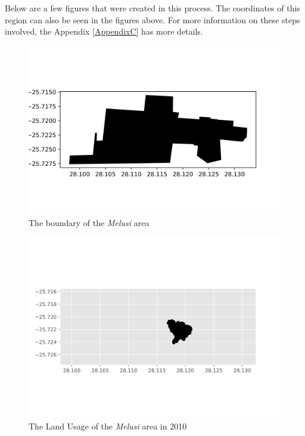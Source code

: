 Below are a few figures that were created in this process. The coordinates of this region can also be seen in the figures above.
For more information on these steps involved, the Appendix \ref{AppendixC} has more details.
\begin{figure}[!ht]
\centering
\includegraphics[width=1\textwidth]{Figures/Chapter3/MelusiArea}
\caption{The boundary of the \textit{Melusi} area}
\end{figure}
\begin{figure}[!ht]
\centering
\includegraphics[width=1\textwidth]{Figures/Chapter3/Melusi2010}
\caption{The Land Usage of the \textit{Melusi} area in 2010}
\label{fig:mel2010}
\end{figure}
